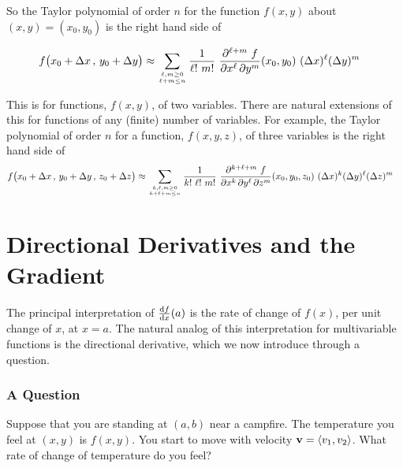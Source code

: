 %
%
So the Taylor polynomial of order $n$ for the function $f(x,y)$ 
about $(x,y)=(x_0,y_0)$ is the right hand side of
\begin{impeqn}\label{eqn Taylor n 2d}
\begin{align*}
f\big(x_0 + \De x\,,\,y_0+\De y\big)
&\approx  
    \sum_{\Atop{\ell,m\ge 0}{\ell+m\le n}}  \frac{1}{\ell!\ m!}\ 
         \frac{\partial^{\ell+m}\ f}{\partial x^\ell\,\partial y^m}(x_0,y_0)\ 
         (\De x)^\ell (\De y)^m
\end{align*}
\end{impeqn}
This is for functions, $f(x,y)$, of two variables. There are natural
extensions of this for functions of any (finite) number of variables.
For example, the Taylor polynomial of order $n$ for a function, $f(x,y,z)$,
of three variables is the right hand side of 
\begin{align*}
f\big(x_0 + \De x\,,\,y_0+\De y\,,\,z_0+\De z\big)
&\approx  
    \sum_{\Atop{k,\ell,m\ge 0}{k+\ell+m\le n}}  \frac{1}{k!\ \ell!\ m!}\ 
         \frac{\partial^{k+\ell+m}\ f}
                 {\partial x^k\,\partial y^\ell\,\partial z^m}(x_0,y_0,z_0)\ 
         (\De x)^k (\De y)^\ell (\De z)^m
\end{align*}


\section{Directional Derivatives and the Gradient}\label{sec directional derivatives}

The principal interpretation of $\diff{f}{x}(a)$ is the rate of change of
$f(x)$, per unit change of $x$, at $x=a$. The natural analog of this
interpretation for multivariable functions is the directional derivative,
which we now introduce through a question.

\subsubsection{A Question}
Suppose that you are standing at $(a,b)$ near a campfire.
The temperature you feel at $(x,y)$ is $f(x,y)$. You start
to move with velocity $\mathbf{v}=\left< v_1,v_2\right> $. What rate of change of temperature do you feel? 

